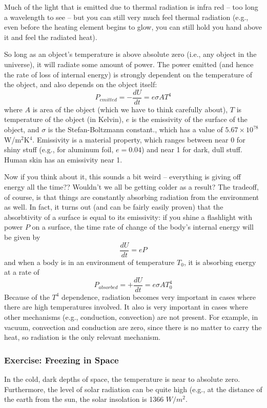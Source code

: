 \documentclass[10pt]{book}
\begin{document}
Much of the light that is emitted due to thermal radiation is infra red -- too long a wavelength to see -- but you can still very much feel thermal radiation (e.g., even before the heating element begins to glow, you can still hold you hand above it and feel the radiated heat).

So long as an object's temperature is above absolute zero (i.e., any object in the universe), it will  radiate some amount of power.  The power emitted (and hence the rate of loss of internal energy) is strongly dependent on the temperature of the object, and also depends on the object itself:
$$P_{emitted} = -\frac{dU}{dt}  = e \sigma A T^4$$
where $A$ is area of the object (which we have to think carefully about), $T$ is temperature of the object (in Kelvin), $e$ is the emissivity of the surface of the object, and  $\sigma$ is the Stefan-Boltzmann constant., which has a value of $5.67\times 10^{?8}$ W/m$^{2}$K$^4$.  Emissivity is a material property, which ranges between near 0 for shiny stuff (e.g., for aluminum foil, $e=0.04$) and near 1 for dark, dull stuff.  Human skin has an emissivity near 1.

Now if you think about it, this sounds a bit weird -- everything is giving off energy all the time??  Wouldn't we all be getting colder as a result?  The tradeoff, of course, is that things are constantly absorbing radiation from the environment as well.
  In fact, it turns out (and can be fairly easily proven) that the absorbtivity of a surface is equal to its emissivity:  if you shine a flashlight with power $P$ on a surface, the time rate of change of the body's internal energy will be given by
$$\frac{dU}{dt}  = eP$$
and when a body is in an environment of temperature $T_0$, it is absorbing energy at a rate of 
$$P_{absorbed} = +\frac{dU}{dt}  = e \sigma A T_0^4$$
Because of the $T^4$ dependence, radiation becomes very important in cases where there are high temperatures involved.  It also is very important in cases where other mechanisms (e.g., conduction, convection) are not present.  For example, in vacuum, convection and conduction are zero, since there is no matter to carry the heat, so radiation is the only relevant mechanism. 

\subsubsection{Exercise: Freezing in Space}

In the cold, dark depths of space, the temperature is near to absolute zero.  Furthermore, the level of solar radiation can be quite high (e.g., at the distance of the earth from the sun, the solar insolation is 1366 $W/m^2$.  
\end{document}
